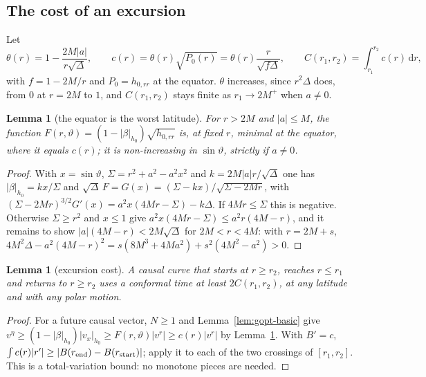 \documentclass[aip,jmp,amsmath,amssymb,reprint]{revtex4-2}
\newcommand{\dd}{\mathrm{d}}
\theoremstyle{plain}
\newtheorem{lemma}[proposition]{Lemma}
\theoremstyle{definition}
\begin{document}
\subsection{The cost of an excursion}
Let
\begin{equation}
  \theta(r)=1-\frac{2M|a|}{r\sqrt\Delta},\qquad
  c(r)=\theta(r)\sqrt{P_0(r)}=\theta(r)\frac{r}{\sqrt{f\Delta}},\qquad
  C(r_1,r_2)=\int_{r_1}^{r_2}c(r)\,\dd r ,
  \label{eq:excursion}
\end{equation}
with $f=1-2M/r$ and $P_0=h_{0,rr}$ at the equator. $\theta$ increases, since $r^2\Delta$ does, from $0$ at $r=2M$ to
$1$, and $C(r_1,r_2)$ stays finite as $r_1\to2M^+$ when $a\neq0$.

\begin{lemma}[the equator is the worst latitude]\label{lem:worst}
For $r>2M$ and $|a|\le M$, the function $F(r,\vartheta)=(1-|\beta|_{h_0})\sqrt{h_{0,rr}}$ is,
at fixed $r$, minimal at the equator, where it equals $c(r)$; it is non-increasing in
$\sin\vartheta$, strictly if $a\ne0$.
\end{lemma}

\begin{proof}
With $x=\sin\vartheta$, $\Sigma=r^2+a^2-a^2x^2$ and $k=2M|a|r/\sqrt\Delta$ one has
$|\beta|_{h_0}=kx/\Sigma$ and $\sqrt\Delta\,F=G(x)=(\Sigma-kx)/\sqrt{\Sigma-2Mr}$, with
$(\Sigma-2Mr)^{3/2}G'(x)=a^2x(4Mr-\Sigma)-k\Delta$. If $4Mr\le\Sigma$ this is negative.
Otherwise $\Sigma\ge r^2$ and $x\le1$ give $a^2x(4Mr-\Sigma)\le a^2r(4M-r)$, and it remains to
show $|a|(4M-r)<2M\sqrt\Delta$ for $2M<r<4M$: with $r=2M+s$,
$4M^2\Delta-a^2(4M-r)^2=s(8M^3+4Ma^2)+s^2(4M^2-a^2)>0$.
\end{proof}

\begin{lemma}[excursion cost]\label{lem:excursion}
A causal curve that starts at $r\ge r_2$, reaches $r\le r_1$ and returns to $r\ge r_2$ uses a
conformal time at least $2C(r_1,r_2)$, at any latitude and with any polar motion.
\end{lemma}

\begin{proof}
For a future causal vector, $N\ge1$ and Lemma~\ref{lem:gopt-basic} give
$v^\eta\ge(1-|\beta|_{h_0})|v_x|_{h_0}\ge F(r,\vartheta)|v^r|\ge c(r)|v^r|$ by
Lemma~\ref{lem:worst}. With $B'=c$, $\int c(r)|r'|\ge|B(r_{\rm end})-B(r_{\rm start})|$; apply
it to each of the two crossings of $[r_1,r_2]$. This is a total-variation bound: no
monotone pieces are needed.
\end{proof}
\end{document}
